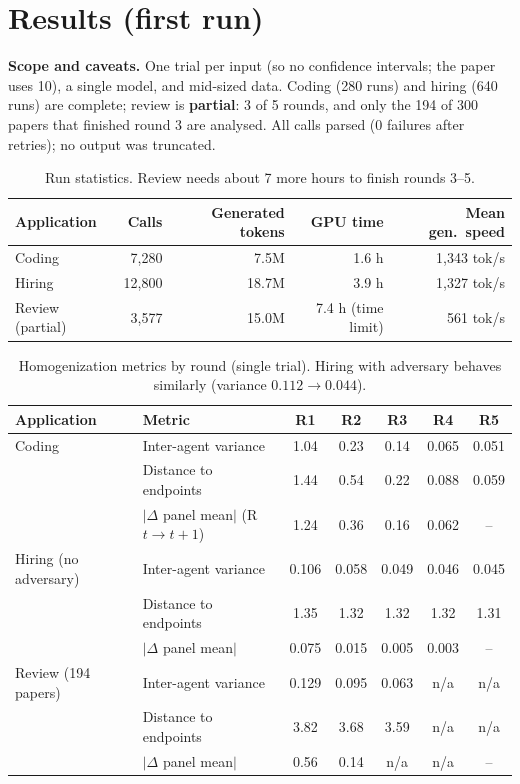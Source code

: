 \documentclass[11pt]{article}
\begin{document}
\section{Results (first run)}
\textbf{Scope and caveats.} One trial per input (so no confidence intervals; the paper uses 10), a single model, and mid-sized data. Coding (280 runs) and hiring (640 runs) are complete; review is \textbf{partial}: 3 of 5 rounds, and only the 194 of 300 papers that finished round 3 are analysed. All calls parsed (0 failures after retries); no output was truncated.

\begin{table}[H]\centering\small
\begin{tabular}{@{}lrrrr@{}}
\toprule
Application & Calls & Generated tokens & GPU time & Mean gen.\ speed\\\midrule
Coding & 7,280 & 7.5M & 1.6 h & 1,343 tok/s\\
Hiring & 12,800 & 18.7M & 3.9 h & 1,327 tok/s\\
Review (partial) & 3,577 & 15.0M & 7.4 h (time limit) & 561 tok/s\\\bottomrule
\end{tabular}
\caption{Run statistics. Review needs about 7 more hours to finish rounds 3--5.}
\end{table}

\begin{table}[H]\centering\small
\begin{tabular}{@{}llccccc@{}}
\toprule
Application & Metric & R1 & R2 & R3 & R4 & R5\\\midrule
Coding & Inter-agent variance & 1.04 & 0.23 & 0.14 & 0.065 & 0.051\\
 & Distance to endpoints & 1.44 & 0.54 & 0.22 & 0.088 & 0.059\\
 & $|\Delta$ panel mean$|$ (R$t\!\to\!t{+}1$) & 1.24 & 0.36 & 0.16 & 0.062 & --\\\addlinespace
Hiring (no adversary) & Inter-agent variance & 0.106 & 0.058 & 0.049 & 0.046 & 0.045\\
 & Distance to endpoints & 1.35 & 1.32 & 1.32 & 1.32 & 1.31\\
 & $|\Delta$ panel mean$|$ & 0.075 & 0.015 & 0.005 & 0.003 & --\\\addlinespace
Review (194 papers) & Inter-agent variance & 0.129 & 0.095 & 0.063 & n/a & n/a\\
 & Distance to endpoints & 3.82 & 3.68 & 3.59 & n/a & n/a\\
 & $|\Delta$ panel mean$|$ & 0.56 & 0.14 & n/a & n/a & --\\\bottomrule
\end{tabular}
\caption{Homogenization metrics by round (single trial). Hiring with adversary behaves similarly (variance $0.112\to0.044$).}
\end{table}
\end{document}
